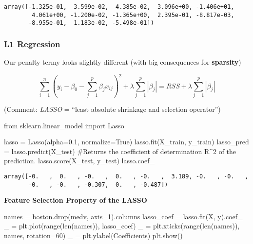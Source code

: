 \documentclass[
  letterpaper,
  DIV=11,
  numbers=noendperiod]{scrreprt}
\newenvironment{Shaded}{\begin{snugshade}}{\end{snugshade}}
\newcommand{\BuiltInTok}[1]{\textcolor[rgb]{0.00,0.23,0.31}{#1}}
\newcommand{\CommentTok}[1]{\textcolor[rgb]{0.37,0.37,0.37}{#1}}
\newcommand{\DecValTok}[1]{\textcolor[rgb]{0.68,0.00,0.00}{#1}}
\newcommand{\FloatTok}[1]{\textcolor[rgb]{0.68,0.00,0.00}{#1}}
\newcommand{\ImportTok}[1]{\textcolor[rgb]{0.00,0.46,0.62}{#1}}
\newcommand{\NormalTok}[1]{\textcolor[rgb]{0.00,0.23,0.31}{#1}}
\newcommand{\OperatorTok}[1]{\textcolor[rgb]{0.37,0.37,0.37}{#1}}
\newcommand{\StringTok}[1]{\textcolor[rgb]{0.13,0.47,0.30}{#1}}
\newcommand{\VariableTok}[1]{\textcolor[rgb]{0.07,0.07,0.07}{#1}}
\begin{document}
\begin{verbatim}
array([-1.325e-01,  3.599e-02,  4.385e-02,  3.096e+00, -1.406e+01,
        4.061e+00, -1.200e-02, -1.365e+00,  2.395e-01, -8.817e-03,
       -8.955e-01,  1.183e-02, -5.498e-01])
\end{verbatim}

\hypertarget{l1-regression}{%
\subsubsection{L1 Regression}\label{l1-regression}}

Our penalty termy looks slightly different (with big consequences for
\textbf{sparsity})

\[
\sum_{i=1}^n{\left( y_i - \beta_0 - \sum_{j=1}^p{\beta_j x_{ij}} \right)^2} + \lambda \sum_{j=1}^p{| \beta_j |} = RSS + \lambda \sum_{j=1}^p{| \beta_j |}
\]

(Comment: \emph{LASSO} = ``least absolute shrinkage and selection
operator'')

\begin{Shaded}
\begin{Highlighting}[]
\ImportTok{from}\NormalTok{ sklearn.linear\_model }\ImportTok{import}\NormalTok{ Lasso}

\NormalTok{lasso }\OperatorTok{=}\NormalTok{ Lasso(alpha}\OperatorTok{=}\FloatTok{0.1}\NormalTok{, normalize}\OperatorTok{=}\VariableTok{True}\NormalTok{)}
\NormalTok{lasso.fit(X\_train, y\_train)}
\NormalTok{lasso\_pred }\OperatorTok{=}\NormalTok{ lasso.predict(X\_test)}
\CommentTok{\#Returns the coefficient of determination R\^{}2 of the prediction.}
\NormalTok{lasso.score(X\_test, y\_test)}
\NormalTok{lasso.coef\_}
\end{Highlighting}
\end{Shaded}

\begin{verbatim}
array([-0.   ,  0.   , -0.   ,  0.   , -0.   ,  3.189, -0.   , -0.   ,
       -0.   , -0.   , -0.307,  0.   , -0.487])
\end{verbatim}

\textbf{Feature Selection Property of the LASSO}

\begin{Shaded}
\begin{Highlighting}[]
\NormalTok{names }\OperatorTok{=}\NormalTok{ boston.drop(}\StringTok{\textquotesingle{}medv\textquotesingle{}}\NormalTok{, axis}\OperatorTok{=}\DecValTok{1}\NormalTok{).columns}
\NormalTok{lasso\_coef }\OperatorTok{=}\NormalTok{ lasso.fit(X, y).coef\_}
\NormalTok{\_ }\OperatorTok{=}\NormalTok{ plt.plot(}\BuiltInTok{range}\NormalTok{(}\BuiltInTok{len}\NormalTok{(names)), lasso\_coef)}
\NormalTok{\_ }\OperatorTok{=}\NormalTok{ plt.xticks(}\BuiltInTok{range}\NormalTok{(}\BuiltInTok{len}\NormalTok{(names)), names, rotation}\OperatorTok{=}\DecValTok{60}\NormalTok{)}
\NormalTok{\_ }\OperatorTok{=}\NormalTok{ plt.ylabel(}\StringTok{\textquotesingle{}Coefficients\textquotesingle{}}\NormalTok{)}
\NormalTok{plt.show()}
\end{Highlighting}
\end{Shaded}
\end{document}
